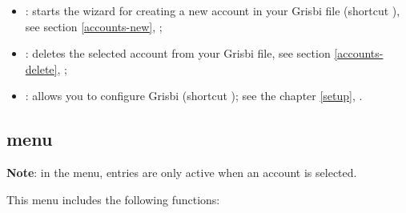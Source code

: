 \begin{itemize}
\begin{itemize}
	\end{itemize}
	\item {}: starts the wizard for creating a new account in your Grisbi file (shortcut ), see section \vref{accounts-new}, ;
	\item {}: deletes the selected account from your Grisbi file, see section \vref{accounts-delete}, ;
	\item {}: allows you to configure Grisbi (shortcut ); see the chapter \vref{setup}, .
\end{itemize}


\subsection{ menu\label{home-menus-display}}

\textbf{Note}: in the  menu, entries are only active when an account is selected.

This menu includes the following functions: 


